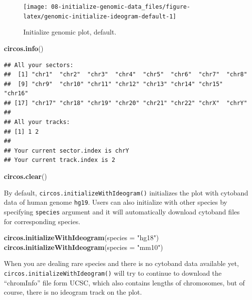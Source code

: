 \documentclass[]{book}
\newenvironment{Shaded}{\begin{snugshade}}{\end{snugshade}}
\newcommand{\KeywordTok}[1]{\textcolor[rgb]{0.13,0.29,0.53}{\textbf{#1}}}
\newcommand{\DataTypeTok}[1]{\textcolor[rgb]{0.13,0.29,0.53}{#1}}
\newcommand{\StringTok}[1]{\textcolor[rgb]{0.31,0.60,0.02}{#1}}
\newcommand{\NormalTok}[1]{#1}
\theoremstyle{definition}
\theoremstyle{definition}
\theoremstyle{remark}
\begin{document}
\begin{figure}

{\centering \texttt{[image: 08-initialize-genomic-data\_files/figure-latex/genomic-initialize-ideogram-default-1]} 

}

\caption{Initialize genomic plot, default.}\label{fig:genomic-initialize-ideogram-default}
\end{figure}

\begin{Shaded}
\begin{Highlighting}[]
\KeywordTok{circos.info}\NormalTok{()}
\end{Highlighting}
\end{Shaded}

\begin{verbatim}
## All your sectors:
##  [1] "chr1"  "chr2"  "chr3"  "chr4"  "chr5"  "chr6"  "chr7"  "chr8" 
##  [9] "chr9"  "chr10" "chr11" "chr12" "chr13" "chr14" "chr15" "chr16"
## [17] "chr17" "chr18" "chr19" "chr20" "chr21" "chr22" "chrX"  "chrY" 
## 
## All your tracks:
## [1] 1 2
## 
## Your current sector.index is chrY
## Your current track.index is 2
\end{verbatim}

\begin{Shaded}
\begin{Highlighting}[]
\KeywordTok{circos.clear}\NormalTok{()}
\end{Highlighting}
\end{Shaded}

By default, \texttt{circos.initializeWithIdeogram()} initializes the
plot with cytoband data of human genome \texttt{hg19}. Users can also
initialize with other species by specifying \texttt{species} argument
and it will automatically download cytoband files for corresponding
species.

\begin{Shaded}
\begin{Highlighting}[]
\KeywordTok{circos.initializeWithIdeogram}\NormalTok{(}\DataTypeTok{species =} \StringTok{"hg18"}\NormalTok{)}
\KeywordTok{circos.initializeWithIdeogram}\NormalTok{(}\DataTypeTok{species =} \StringTok{"mm10"}\NormalTok{)}
\end{Highlighting}
\end{Shaded}

When you are dealing rare species and there is no cytoband data
available yet, \texttt{circos.initializeWithIdeogram()} will try to
continue to download the ``chromInfo'' file form UCSC, which also
contains lengths of chromosomes, but of course, there is no ideogram
track on the plot.
\end{document}
